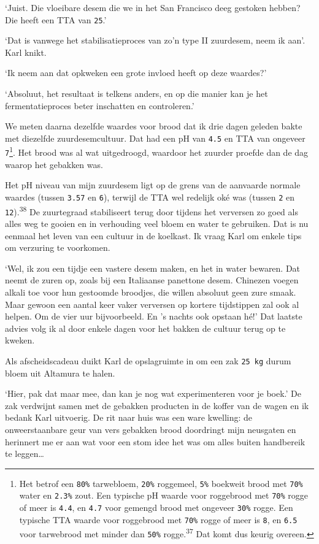 \documentclass[
  11pt,
  dutch,
]{memoir}
\begin{document}
`Juist. Die vloeibare desem die we in het San Francisco deeg gestoken
hebben? Die heeft een TTA van \texttt{25}.'

`Dat is vanwege het stabilisatieproces van zo'n type II zuurdesem, neem
ik aan'. Karl knikt.

`Ik neem aan dat opkweken een grote invloed heeft op deze waardes?'

`Absoluut, het resultaat is telkens anders, en op die manier kan je het
fermentatieproces beter inschatten en controleren.'

We meten daarna dezelfde waardes voor brood dat ik drie dagen geleden
bakte met diezelfde zuurdesemcultuur. Dat had een pH van \texttt{4.5} en
TTA van ongeveer \texttt{7}\footnote{Het betrof een \texttt{80\%}
  tarwebloem, \texttt{20\%} roggemeel, \texttt{5\%} boekweit brood met
  \texttt{70\%} water en \texttt{2.3\%} zout. Een typische pH waarde
  voor roggebrood met \texttt{70\%} rogge of meer is \texttt{4.4}, en
  \texttt{4.7} voor gemengd brood met ongeveer \texttt{30\%} rogge. Een
  typische TTA waarde voor roggebrood met \texttt{70\%} rogge of meer is
  \texttt{8}, en \texttt{6.5} voor tarwebrood met minder dan
  \texttt{50\%} rogge.\textsuperscript{37} Dat komt dus keurig overeen.}.
Het brood was al wat uitgedroogd, waardoor het zuurder proefde dan de
dag waarop het gebakken was.

Het pH niveau van mijn zuurdesem ligt op de grens van de aanvaarde
normale waardes (tussen \texttt{3.57} en \texttt{6}), terwijl de TTA wel
redelijk oké was (tussen \texttt{2} en \texttt{12}).\textsuperscript{38}
De zuurtegraad stabiliseert terug door tijdens het verversen zo goed als
alles weg te gooien en in verhouding veel bloem en water te gebruiken.
Dat is nu eenmaal het leven van een cultuur in de koelkast. Ik vraag
Karl om enkele tips om verzuring te voorkomen.

`Wel, ik zou een tijdje een vastere desem maken, en het in water
bewaren. Dat neemt de zuren op, zoals bij een Italiaanse panettone
desem. Chinezen voegen alkali toe voor hun gestoomde broodjes, die
willen absoluut geen zure smaak. Maar gewoon een aantal keer vaker
verversen op kortere tijdstippen zal ook al helpen. Om de vier uur
bijvoorbeeld. En 's nachts ook opstaan hé!' Dat laatste advies volg ik
al door enkele dagen voor het bakken de cultuur terug op te kweken.

Als afscheidscadeau duikt Karl de opslagruimte in om een zak
\texttt{25\ kg} durum bloem uit Altamura te halen.

`Hier, pak dat maar mee, dan kan je nog wat experimenteren voor je
boek.' De zak verdwijnt samen met de gebakken producten in de koffer van
de wagen en ik bedank Karl uitvoerig. De rit naar huis was een ware
kwelling: de onweerstaanbare geur van vers gebakken brood doordringt
mijn neusgaten en herinnert me er aan wat voor een stom idee het was om
alles buiten handbereik te leggen\ldots{}
\end{document}
